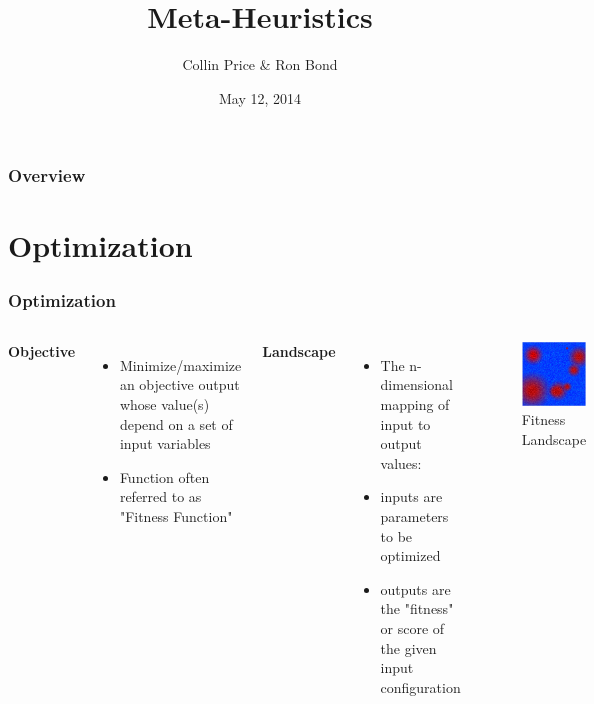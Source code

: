\documentclass{beamer}
\title[Meta-Heuristics]{Meta-Heuristics} %
\author{Collin Price \& Ron Bond} %
\institute[Brock University] %
{
\medskip
}
\date{May 12, 2014} %
\begin{document}
\begin{frame}
\titlepage %
\end{frame}

\begin{frame}
\frametitle{Overview} %
\tableofcontents %
\end{frame}


\section{Optimization}
\begin{frame}
\frametitle{Optimization}
\begin{columns}[c]
\textbf{Objective}
\begin{itemize}
\item Minimize/maximize an objective output whose value(s) depend on a set of input variables
\item Function often referred to as "Fitness Function"
\end{itemize}

\textbf{Landscape}
\begin{itemize}
\item The n-dimensional mapping of input to output values:
\item inputs are parameters to be optimized
\item outputs are the "fitness" or score of the given input configuration
\end{itemize}

\begin{figure}
\centering
\includegraphics[width=20mm]{func.png}
\caption{Fitness Landscape}
\label{exampleFunction}
\end{figure}

\end{columns}
\end{frame}
\end{document}

